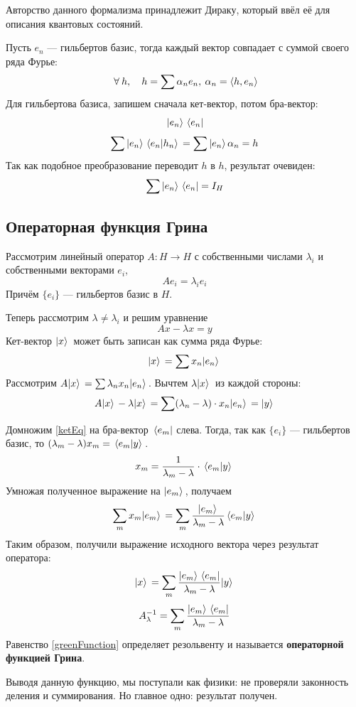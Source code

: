 \documentclass[12pt]{article}
\begin{document}
		Авторство данного формализма принадлежит Дираку, который ввёл её для описания квантовых состояний.
	
		Пусть $e_n$ --- гильбертов базис, тогда каждый вектор совпадает с суммой своего ряда Фурье:
		$$ \forall h,\quad h = \sum \alpha_n e_n,\: \alpha_n = \scal{h}{e_n} $$
		Для гильбертова базиса, запишем сначала кет-вектор, потом бра-вектор:
		$$ | e_n \rangle \, \, \langle e_n | $$
		$$ \sum | e_n \rangle \, \, \langle e_n | h_n \rangle \, = \sum | e_n \rangle \, \alpha_n = h $$
		Так как подобное преобразование переводит $h$ в $h$, результат очевиден:
		$$ \sum | e_n \rangle \, \, \langle e_n | = I_H $$
	
	\subsection{Операторная функция Грина}
	
		Рассмотрим линейный оператор $A : H \rightarrow H$ с собственными числами $\lambda_i$ и собственными векторами $e_i$,
		$$A e_i = \lambda_i e_i$$
		Причём $\{e_i\}$ --- гильбертов базис в $H$.
	
		Теперь рассмотрим $\lambda \neq \lambda_i$ и решим уравнение
		$$ Ax - \lambda x = y $$
		Кет-вектор $| x \rangle \,$ может быть записан как сумма ряда Фурье:
		$$ | x \rangle \, = \sum x_n | e_n \rangle \, $$
		Рассмотрим $A | x \rangle \, = \sum \lambda_n x_n | e_n \rangle \,$. Вычтем $\lambda | x \rangle \,$ из каждой стороны:
		\begin{equation} \label{ketEq}
			A| x \rangle \, - \lambda| x \rangle \, = \sum (\lambda_n - \lambda) \cdot x_n | e_n \rangle \, = | y \rangle \,
		\end{equation}
	
		Домножим \eqref{ketEq} на бра-вектор $\, \langle e_m |$ слева. Тогда, так как $\{e_i\}$ --- гильбертов базис,
		то $(\lambda_m - \lambda) x_m = \, \langle e_m | y \rangle \,$.
		$$ x_m = \frac{1}{\lambda_m - \lambda} \cdot \, \langle e_m | y \rangle \, $$
		Умножая полученное выражение на $| e_m \rangle \,$, получаем
		$$ \sum_m x_m | e_m \rangle \, = \sum_m \frac{| e_m \rangle \,}{\lambda_m - \lambda} \, \langle e_m | y \rangle \, $$
		Таким образом, получили выражение исходного вектора через результат оператора:
		$$ | x \rangle \, = \sum_m \frac{| e_m \rangle \, \, \langle e_m |}{\lambda_m - \lambda} | y \rangle \, $$
		\begin{equation} \label{greenFunction}
			A^{-1}_{\lambda} = \sum_m \frac{| e_m \rangle \, \, \langle e_m |}{\lambda_m - \lambda}
		\end{equation}
		Равенство \eqref{greenFunction} определяет резольвенту и называется \textbf{операторной функцией Грина}.
	
		Выводя данную функцию, мы поступали как физики: не проверяли законность деления и суммирования. Но главное одно:
		результат получен.
	
\end{document}
